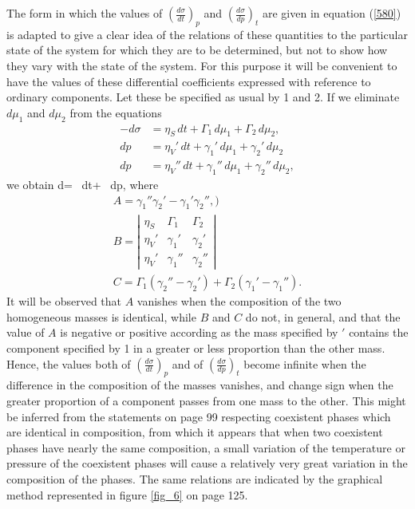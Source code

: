 \documentclass[12pt]{article}
\begin{document}
{The form in which the values of $\left(\frac{d\sigma}{dt}\right)_p$ and $\left(\frac{d\sigma}{dp}\right)_t$ are given in equation (\ref{580}) is adapted to give a clear idea of the relations of these quantities to the particular state of the system for which they are to be determined, but not to show how they vary with the state of the system. For this purpose it will be convenient to have the values of these differential coefficients expressed with reference to ordinary components. Let these be specified as usual by 1 and 2. If we eliminate $d\mu_1$ and $d\mu_2$ from the equations
\begin{align*}-d\sigma &= \eta_S \,dt + \Gamma_1 \, d\mu_1 +\Gamma_2 \, d\mu_2, \\
dp &= \eta_V' \,dt + \gamma_1' \, d\mu_1 +\gamma_2' \, d\mu_2  \\
dp &= \eta_V'' \,dt + \gamma_1'' \, d\mu_1 +\gamma_2'' \, d\mu_2, \end{align*}
we obtain
\eqs d\sigma= \, dt+ \, dp,  \label{581} \eqe
where
\begin{gather}
A = \gamma_1''\gamma_2' - \gamma_1'\gamma_2'',  \label{582}) \\
B=  \left| \begin{array}{ccc} 
\eta_S & \Gamma_1 & \Gamma_2  \\
\eta_V' & \gamma_1' & \gamma_2'  \\
\eta_V' & \gamma_1'' & \gamma_2'' \end{array}\right|     \label{583} \\
C= \Gamma_1(\gamma_2'' - \gamma_2')+ \Gamma_2(\gamma_1' - \gamma_1'').   \label{584} \end{gather}
It will be observed that $A$ vanishes when the composition of the two homogeneous masses is identical, while $B$ and $C$ do not, in general, and that the value of $A$ is negative or positive according as the mass specified by $'$ contains the component specified by 1 in a greater or less proportion than the other mass.  Hence, the values both of $\left(\frac{d\sigma}{dt}\right)_p$ and of $\left(\frac{d\sigma}{dp}\right)_t$ become infinite when the difference in the composition of the masses vanishes, and change sign when the greater proportion of a component passes from one mass to the other. This might be inferred from the statements on page 99 respecting coexistent phases which are identical in composition, from which it appears that when two coexistent phases have nearly the same composition, a small variation of the temperature or pressure of the coexistent phases will cause a relatively very great variation in the composition of the phases. The same relations are indicated by the graphical method represented in figure \ref{fig_6} on page 125.

}
\end{document}

